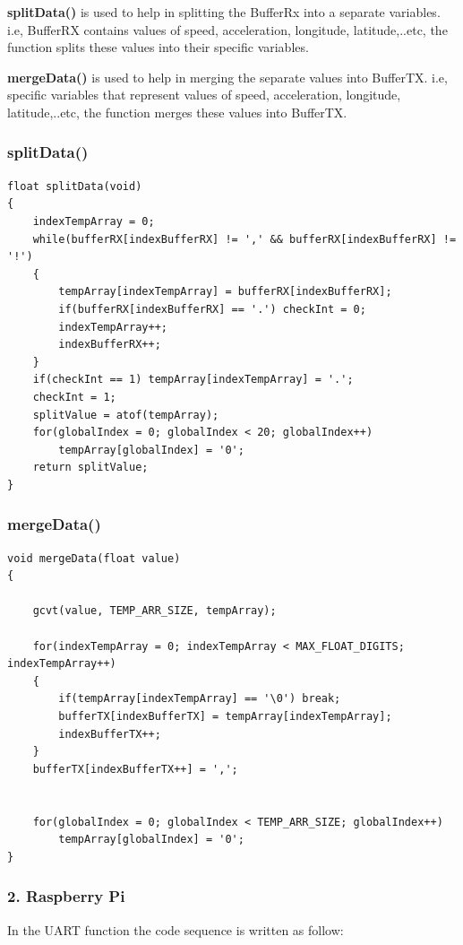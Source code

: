 \textbf{splitData()} is used to help in splitting the BufferRx into a separate variables. i.e, BufferRX contains values of speed, acceleration, longitude, latitude,..etc, the function splits these values into their specific variables.

\textbf{mergeData()} is used to help in merging the separate values into BufferTX. i.e, specific variables that represent values of speed, acceleration, longitude, latitude,..etc, the function merges these values into BufferTX.

\subsubsection{splitData()}
\begin{lstlisting}
float splitData(void)
{
	indexTempArray = 0;
	while(bufferRX[indexBufferRX] != ',' && bufferRX[indexBufferRX] != '!')
	{
		tempArray[indexTempArray] = bufferRX[indexBufferRX];
		if(bufferRX[indexBufferRX] == '.') checkInt = 0;
		indexTempArray++;
		indexBufferRX++;
	}
	if(checkInt == 1) tempArray[indexTempArray] = '.';
	checkInt = 1;
	splitValue = atof(tempArray);
	for(globalIndex = 0; globalIndex < 20; globalIndex++)
		tempArray[globalIndex] = '0';
	return splitValue;
}
\end{lstlisting}

\subsubsection{mergeData()}
\begin{lstlisting}
void mergeData(float value)
{

	gcvt(value, TEMP_ARR_SIZE, tempArray);

	for(indexTempArray = 0; indexTempArray < MAX_FLOAT_DIGITS; indexTempArray++)
	{
		if(tempArray[indexTempArray] == '\0') break;
		bufferTX[indexBufferTX] = tempArray[indexTempArray];
		indexBufferTX++;
	}
	bufferTX[indexBufferTX++] = ',';


	for(globalIndex = 0; globalIndex < TEMP_ARR_SIZE; globalIndex++)
		tempArray[globalIndex] = '0';
}

\end{lstlisting}

\subsubsection{2. Raspberry Pi}

In the UART function the code sequence is written as follow:

